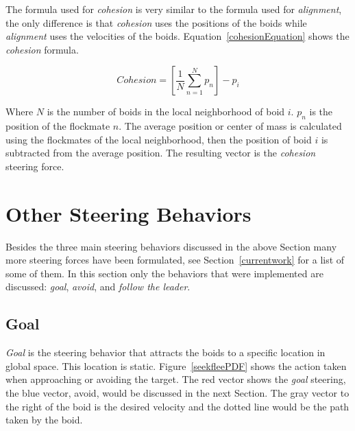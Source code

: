 The formula used for \textit{cohesion} is very similar to the formula used for \textit{alignment}, the only difference is that \textit{cohesion} uses the positions of the boids while \textit{alignment} uses the velocities of the boids. Equation~\ref{cohesionEquation} shows the \textit{cohesion} formula.

\begin{equation}
\label{cohesionEquation}
Cohesion = \left[  \frac{1}{N} \sum_{n=1}^{N} p_n \right ] - p_i
\end{equation}

Where $N$ is the number of boids in the local neighborhood of boid $i$. $p_n$ is the position of the flockmate $n$. The average position or center of mass is calculated using the flockmates of the local neighborhood, then the position of boid $i$ is subtracted from the average position. The resulting vector is the \textit{cohesion} steering force.

\section{Other Steering Behaviors}\label{otherbehaviors}
Besides the three main steering behaviors discussed in the above Section many more steering forces have been formulated, see Section~\ref{currentwork} for a list of some of them. In this section only the behaviors that were implemented are discussed: \textit{goal}, \textit{avoid}, and \textit{follow the leader}.

\subsection{Goal}
\textit{Goal} is the steering behavior that attracts the boids to a specific location in global space. This location is static. Figure~\ref{seekfleePDF} shows the action taken when approaching or avoiding the target. The red vector shows the \textit{goal} steering, the blue vector, avoid, would be discussed in the next Section. The gray vector to the right of the boid is the desired velocity and the dotted line would be the path taken by the boid.

